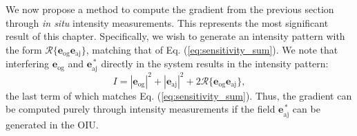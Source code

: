 We now propose a method to compute the gradient from the previous section through \textit{in situ} intensity measurements.  This represents the most significant result of this chapter.  Specifically, we wish to generate an intensity pattern with the form $\mathcal{R}\big\{\mathbf{e}_\textrm{og} \mathbf{e}_\textrm{aj} \big\}$, matching that of Eq. (\ref{eq:sensitivity_sum}).  We note that interfering $\mathbf{e}_{\textrm{og}}$ and $\mathbf{e}_\textrm{aj}^{\,*}$ directly in the system results in the intensity pattern:
\begin{equation}
I = |\mathbf{e}_\textrm{og}|^2 + |\mathbf{e}_\textrm{aj}|^2 + 2\mathcal{R}\big\{\mathbf{e}_\textrm{og}\mathbf{e}_{\textrm{aj}} \big\},
\label{eq:intensity_correct}
\end{equation}
the last term of which matches Eq. (\ref{eq:sensitivity_sum}). Thus, the gradient can be computed purely through intensity measurements if the field $\mathbf{e}_\textrm{aj}^{\,*}$ can be generated in the OIU.

